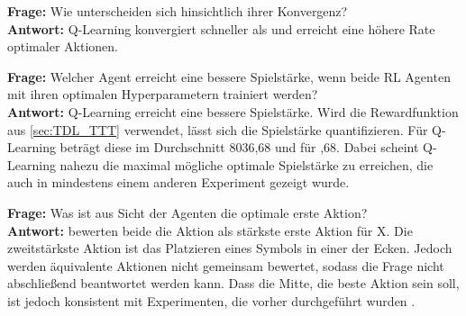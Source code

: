 \textbf{Frage:} Wie unterscheiden sich \bothAlgs hinsichtlich ihrer Konvergenz? \\ \textbf{Antwort:} Q-Learning konvergiert schneller als \sarsa und erreicht eine höhere Rate optimaler Aktionen.

\textbf{Frage:} Welcher Agent erreicht eine bessere Spielstärke, wenn beide RL Agenten mit ihren optimalen Hyperparametern trainiert werden? \\ \textbf{Antwort:} Q-Learning erreicht eine bessere Spielstärke. Wird die Rewardfunktion aus \cref{sec:TDL_TTT} verwendet, lässt sich die Spielstärke quantifizieren. Für Q-Learning beträgt diese im Durchschnitt 8036,68 und für ,68. Dabei scheint Q-Learning nahezu die maximal mögliche optimale Spielstärke zu erreichen, die auch in mindestens einem anderen Experiment \cite{mirnovi.QLearningTicTacToe2020} gezeigt wurde.

\textbf{Frage:} Was ist aus Sicht der Agenten die optimale erste Aktion? \\ \textbf{Antwort:} \bothAlgs bewerten beide die Aktion  als stärkste erste Aktion für X. Die zweitstärkste Aktion ist das Platzieren eines Symbols in einer der Ecken. Jedoch werden äquivalente Aktionen nicht gemeinsam bewertet, sodass die Frage nicht abschließend beantwortet werden kann. Dass die Mitte, die beste Aktion sein soll, ist jedoch konsistent mit Experimenten, die vorher durchgeführt wurden \cite{kutscheraa.BestOpeningMove2018}. 
